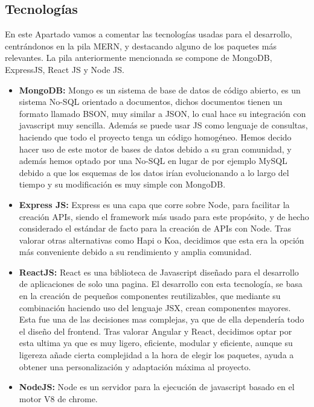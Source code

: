 \subsection {Tecnologías}
En este Apartado vamos a comentar las tecnologías usadas para el desarrollo, centrándonos en la pila MERN, y destacando alguno de los paquetes más relevantes. La pila anteriormente mencionada se compone de MongoDB, ExpressJS, React JS y Node JS.
\begin{itemize}
  \item \textbf{MongoDB:} Mongo es un sistema de base de datos de código abierto, es un sistema No-SQL orientado a documentos, dichos documentos tienen un formato llamado BSON, muy similar a JSON, lo cual hace su integración con javascript muy sencilla. Además se puede usar JS como lenguaje de consultas, haciendo que todo el proyecto tenga un código homogéneo. Hemos decido hacer uso de este motor de bases de datos debido a su gran comunidad, y además hemos optado por una No-SQL en lugar de por ejemplo MySQL debido a que los esquemas de los datos irían evolucionando a lo largo del tiempo y su modificación es muy simple con MongoDB.
  
  \item \textbf{Express JS:} Express es una capa que corre sobre Node, para facilitar la creación APIs, siendo el framework más usado para este propósito, y de hecho considerado el estándar de facto para la creación de APIs con Node. Tras valorar otras alternativas como Hapi o Koa, decidimos que esta era la opción más conveniente debido a su rendimiento y amplia comunidad.
  
  \item \textbf{ReactJS:} React es una biblioteca de Javascript diseñado para el desarrollo de aplicaciones de solo una pagina. El desarrollo con esta tecnología, se basa en la creación de pequeños componentes reutilizables, que mediante su combinación haciendo uso del lenguaje JSX, crean componentes mayores. Esta fue una de las decisiones mas complejas, ya que de ella dependería todo el diseño del frontend. Tras valorar Angular y React, decidimos optar por esta ultima ya que es muy ligero, eficiente, modular y eficiente, aunque su ligereza añade cierta complejidad a la hora de elegir los paquetes, ayuda a obtener una personalización y adaptación máxima al proyecto.
  
  \item \textbf{NodeJS:} Node es un servidor para la ejecución de javascript basado en el motor V8 de chrome. 
\end{itemize}

